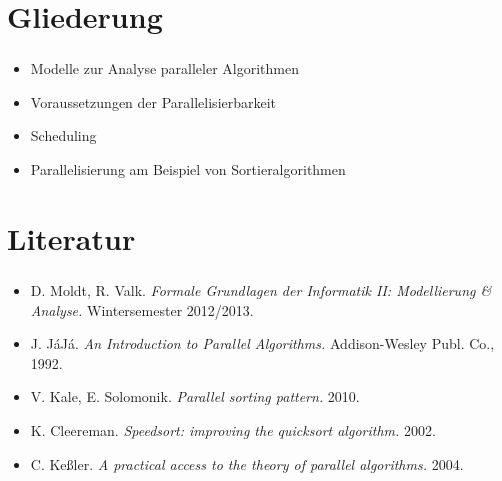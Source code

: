 
\section{Gliederung}
\label{sec:gliederung}

\begin{frame}
\frametitle{\insertsection} 
    \begin{itemize}
        \item Modelle zur Analyse paralleler Algorithmen
        \item Voraussetzungen der Parallelisierbarkeit
        \item Scheduling
        \item Parallelisierung am Beispiel von Sortieralgorithmen
    \end{itemize}
\end{frame}


\section{Literatur}

\begin{frame}
    \frametitle{\insertsection}
    \begin{itemize}
        \item D. Moldt, R. Valk. \emph{Formale Grundlagen der Informatik II: Modellierung \& Analyse.} Wintersemester 2012/2013.
        \item J. J\'aJ\'a. \emph{An Introduction to Parallel Algorithms.} Addison-Wesley Publ. Co., 1992.
        \item V. Kale, E. Solomonik. \emph{Parallel sorting pattern.} 2010.
        \item K. Cleereman. \emph{Speedsort: improving the quicksort algorithm.} 2002.
        \item C. Keßler. \emph{A practical access to the theory of parallel algorithms.} 2004.
    \end{itemize}
\end{frame}


